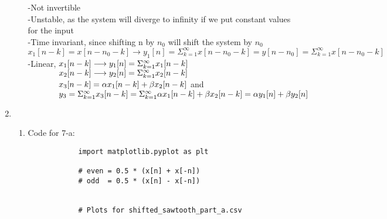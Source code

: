 \documentclass[10pt,a4paper, margin=1in]{article}
\begin{document}
\begin{enumerate}
\begin{enumerate}
        -Not invertible\vspace{0.1cm}\\
        -Unstable, as the system will diverge to infinity if we put constant values for the input\vspace{0.1cm}\\
        -Time invariant, since shifting n by $n_0$ will shift the system by $n_0$\\
            \hspace*{1.3cm}$x_1[n-k] = x[n-n_0-k] \longrightarrow y_1[n] = \Sigma^{\infty}_{k=1}x[n-n_0-k] = y[n-n_0] = \Sigma^{\infty}_{k=1}x[n-n_0-k]$
        \vspace{0.1cm}\\
        -Linear, $x_1[n-k] \longrightarrow y_1[n] = \Sigma^{\infty}_{k=1}x_1[n-k]\\$
                $\hspace*{1.3cm} x_2[n-k] \longrightarrow y_2[n] = \Sigma^{\infty}_{k=1}x_2[n-k]\\$
                $\hspace*{1.3cm} x_3[n-k] =  \alpha x_1[n-k] + \beta x_2[n-k]$ and\\
                $\hspace*{1.3cm}y_3 = \Sigma^{\infty}_{k=1} x_3[n-k] = \Sigma^{\infty}_{k=1}\alpha x_1[n-k] + \beta x_2[n-k] = \alpha y_1[n] + \beta y_2[n]$
        \vspace{1cm}\\
    \end{enumerate}

    \item %
        \begin{enumerate}
        \item %
        
        
        
        
        
        

        Code for 7-a:\\
        \begin{verbatim}
            import matplotlib.pyplot as plt
    
            # even = 0.5 * (x[n] + x[-n])
            # odd  = 0.5 * (x[n] - x[-n])
            
            
            # Plots for shifted_sawtooth_part_a.csv
            

\end{verbatim}
\end{enumerate}
\end{enumerate}
\end{document}
